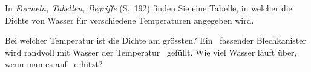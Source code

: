 In \emph{Formeln, Tabellen, Begriffe} (S.~192) finden Sie eine Tabelle, in welcher die Dichte von Wasser für verschiedene Temperaturen angegeben wird.

\begin{abcliste}
\abc Bei welcher Temperatur ist die Dichte am grössten?
\abc Ein \VKaO\ fassender Blechkanister wird randvoll mit Wasser der Temperatur \tKaO\ gefüllt. Wie viel Wasser läuft über, wenn man es auf \tKeO\ erhitzt?
\end{abcliste}
